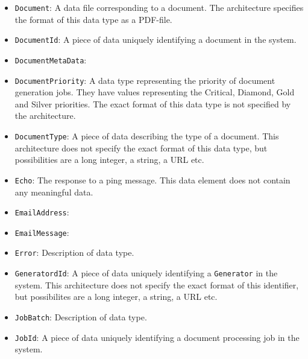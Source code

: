 \documentclass[a4paper,10pt]{article}
\begin{document}
\begin{itemize}
	\item \texttt{Document}: A data file corresponding to a document.  The architecture specifies the format of this data type as a PDF-file. 
	
	\item \texttt{DocumentId}: A piece of data uniquely identifying a document in the system.

	\item \texttt{DocumentMetaData}: 
	
	\item \texttt{DocumentPriority}: A data type representing the priority of document generation jobs. They have values representing the Critical, Diamond, Gold and Silver priorities. The exact format of this data type is not specified by the architecture.
	
	\item \texttt{DocumentType}: A piece of data describing the type of a document. This architecture does not specify the exact format of this data type, but possibilities are a long integer, a string, a URL etc.
	
	\item \texttt{Echo}: The response to a ping message. This data element does not contain any meaningful data.
	
	\item \texttt{EmailAddress}:
	
	\item \texttt{EmailMessage}:
	
	\item \texttt{Error}: Description of data type.
	
    \item \texttt{GeneratordId}: A piece of data uniquely identifying a \texttt{Generator} in the system. This architecture does not specify the exact format of this identifier, but possibilites are a long integer, a string, a URL etc.
    
    \item \texttt{JobBatch}: Description of data type.
    
    \item \texttt{JobId}: A piece of data uniquely identifying a document processing job in the system.
    

\end{itemize}
\end{document}

